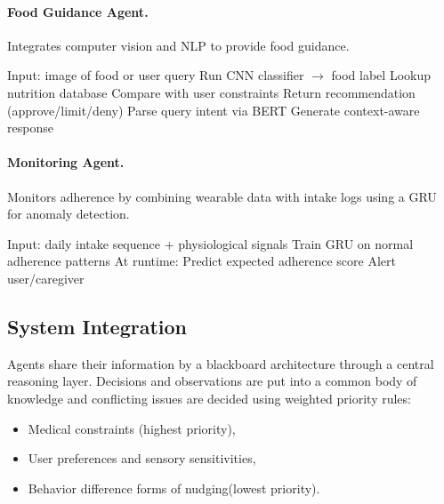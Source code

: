 \documentclass[pdflatex,sn-mathphys-num]{sn-jnl}
\begin{document}
\paragraph{Food Guidance Agent.}  
Integrates computer vision and NLP to provide food guidance.

\begin{algorithm}
	\caption{Food Guidance Agent}
	\begin{algorithmic}[1]
		\State Input: image of food or user query
		\State Run CNN classifier $\rightarrow$ food label
		\State Lookup nutrition database
		\State Compare with user constraints
		\State Return recommendation (approve/limit/deny)
		\Else
		\State Parse query intent via BERT
		\State Generate context-aware response
		\EndIf
	\end{algorithmic}
\end{algorithm}

\paragraph{Monitoring Agent.}  
Monitors adherence by combining wearable data with intake logs using a GRU for anomaly detection.

\begin{algorithm}
	\caption{Monitoring Agent}
	\begin{algorithmic}[1]
		\State Input: daily intake sequence + physiological signals
		\State Train GRU on normal adherence patterns
		\State At runtime:
		\State Predict expected adherence score
		\State Alert user/caregiver
		\EndIf
	\end{algorithmic}
\end{algorithm}

\subsection{System Integration}

Agents share their information by a blackboard architecture through a central reasoning layer. Decisions and observations are put into a common body of knowledge and conflicting issues are decided using weighted priority rules:

\begin{itemize}
	\item Medical constraints (highest priority),
	\item User preferences and sensory sensitivities,
	\item Behavior difference forms of nudging(lowest priority).
\end{itemize}
\end{document}
